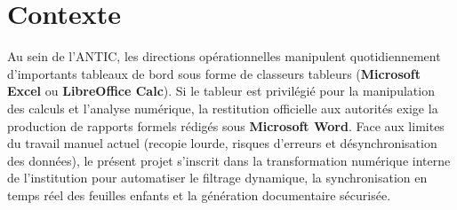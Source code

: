 \chapter{Contexte}

Au sein de l'ANTIC, les directions opérationnelles manipulent quotidiennement d'importants tableaux de bord sous forme de classeurs tableurs (\textbf{Microsoft Excel} ou \textbf{LibreOffice Calc}). Si le tableur est privilégié pour la manipulation des calculs et l'analyse numérique, la restitution officielle aux autorités exige la production de rapports formels rédigés sous \textbf{Microsoft Word}. Face aux limites du travail manuel actuel (recopie lourde, risques d'erreurs et désynchronisation des données), le présent projet s'inscrit dans la transformation numérique interne de l'institution pour automatiser le filtrage dynamique, la synchronisation en temps réel des feuilles enfants et la génération documentaire sécurisée.
